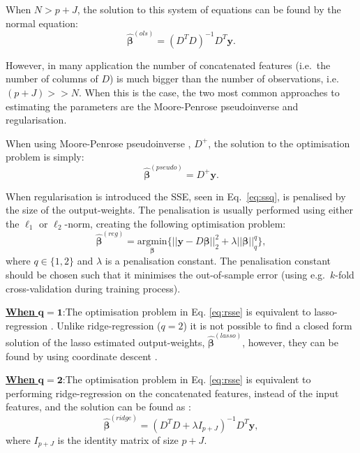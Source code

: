 \documentclass[
]{jss}
\begin{document}
When \(N > p + J\), the solution to this system of equations can be
found by the normal equation: \begin{equation}
\hat{\boldsymbol{\beta}}^{(ols)} = (D^T D)^{-1}D^T\boldsymbol{y}. \label{eq:ols}
\end{equation}

However, in many application the number of concatenated features
(i.e.~the number of columns of \(D\)) is much bigger than the number of
observations, i.e.~\((p + J) >> N\). When this is the case, the two most
common approaches to estimating the parameters are the Moore-Penrose
pseudoinverse and regularisation.

When using Moore-Penrose pseudoinverse
\citep[\citet{PenroseInv}]{BjerhammarInv}, \(D^+\), the solution to the
optimisation problem is simply: \begin{equation}
\hat{\boldsymbol \beta}^{(pseudo)} = D^+ \boldsymbol y.
\end{equation}

When regularisation is introduced the SSE, seen in Eq.~\eqref{eq:ssq},
is penalised by the size of the output-weights. The penalisation is
usually performed using either the \(\ell_1\) or \(\ell_2\)-norm,
creating the following optimisation problem: \begin{equation}
\hat{\boldsymbol{\beta}}^{(reg)} = \underset{\boldsymbol{\beta}}{\text{argmin}} \Big\{ || \boldsymbol{y} - D\boldsymbol{\beta}||_2^2  + \lambda||\boldsymbol{\beta}||_q^q \Big\}, \label{eq:rsse}
\end{equation} where \(q \in \{1, 2\}\) and \(\lambda\) is a
penalisation constant. The penalisation constant should be chosen such
that it minimises the out-of-sample error (using e.g.~\(k\)-fold
cross-validation during training process).

\underline{\textbf{When} $\boldsymbol{q = 1}$}:\newline The optimisation
problem in Eq. \eqref{eq:rsse} is equivalent to lasso-regression
\citep[\citet{TibLasso}]{SanLasso}. Unlike ridge-regression (\(q = 2\))
it is not possible to find a closed form solution of the lasso estimated
output-weights, \(\hat{\boldsymbol{\beta}}^{(lasso)}\), however, they
can be found by using coordinate descent \citep{CoordLasso}.

\underline{\textbf{When} $\boldsymbol{q = 2}$}:\newline The optimisation
problem in Eq. \eqref{eq:rsse} is equivalent to performing
ridge-regression on the concatenated features, instead of the input
features, and the solution can be found as \citep{ridgeReg}:
\begin{equation}
\hat{\boldsymbol \beta}^{(ridge)} = \left(D^TD + \lambda I_{p + J}\right)^{-1}D^T\boldsymbol y,
\end{equation} where \(I_{p+J}\) is the identity matrix of size \(p+J\).
\end{document}
